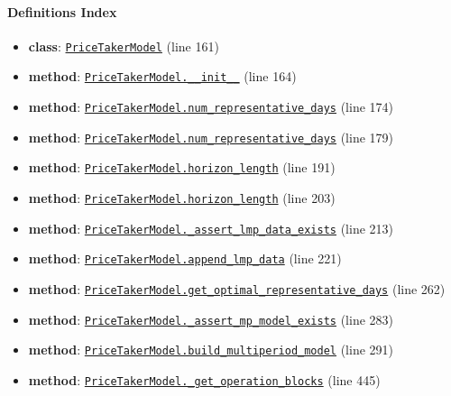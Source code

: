 \documentclass[11pt]{report}
\begin{document}
\paragraph{Definitions Index}
\begin{itemize}[leftmargin=*]
  \item \textbf{class}: \hyperref[def:pricetaker-price_taker_model.py:PriceTakerModel:L161]{\texttt{PriceTakerModel}} (line 161)
  \item \textbf{method}: \hyperref[def:pricetaker-price_taker_model.py:PriceTakerModel.__init__:L164]{\texttt{PriceTakerModel.\_\_init\_\_}} (line 164)
  \item \textbf{method}: \hyperref[def:pricetaker-price_taker_model.py:PriceTakerModel.num_representative_days:L174]{\texttt{PriceTakerModel.num\_representative\_days}} (line 174)
  \item \textbf{method}: \hyperref[def:pricetaker-price_taker_model.py:PriceTakerModel.num_representative_days:L179]{\texttt{PriceTakerModel.num\_representative\_days}} (line 179)
  \item \textbf{method}: \hyperref[def:pricetaker-price_taker_model.py:PriceTakerModel.horizon_length:L191]{\texttt{PriceTakerModel.horizon\_length}} (line 191)
  \item \textbf{method}: \hyperref[def:pricetaker-price_taker_model.py:PriceTakerModel.horizon_length:L203]{\texttt{PriceTakerModel.horizon\_length}} (line 203)
  \item \textbf{method}: \hyperref[def:pricetaker-price_taker_model.py:PriceTakerModel._assert_lmp_data_exists:L213]{\texttt{PriceTakerModel.\_assert\_lmp\_data\_exists}} (line 213)
  \item \textbf{method}: \hyperref[def:pricetaker-price_taker_model.py:PriceTakerModel.append_lmp_data:L221]{\texttt{PriceTakerModel.append\_lmp\_data}} (line 221)
  \item \textbf{method}: \hyperref[def:pricetaker-price_taker_model.py:PriceTakerModel.get_optimal_representative_days:L262]{\texttt{PriceTakerModel.get\_optimal\_representative\_days}} (line 262)
  \item \textbf{method}: \hyperref[def:pricetaker-price_taker_model.py:PriceTakerModel._assert_mp_model_exists:L283]{\texttt{PriceTakerModel.\_assert\_mp\_model\_exists}} (line 283)
  \item \textbf{method}: \hyperref[def:pricetaker-price_taker_model.py:PriceTakerModel.build_multiperiod_model:L291]{\texttt{PriceTakerModel.build\_multiperiod\_model}} (line 291)
  \item \textbf{method}: \hyperref[def:pricetaker-price_taker_model.py:PriceTakerModel._get_operation_blocks:L445]{\texttt{PriceTakerModel.\_get\_operation\_blocks}} (line 445)

\end{itemize}
\end{document}
